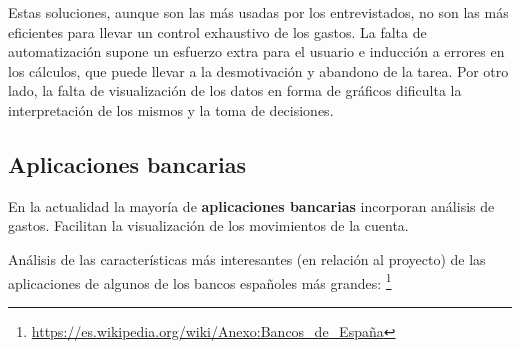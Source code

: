 

Estas soluciones, aunque son las más usadas por los entrevistados, no son las más 
eficientes para llevar un control exhaustivo de los gastos. La falta de automatización 
supone un esfuerzo extra para el usuario e inducción a errores en los cálculos, que puede 
llevar a la desmotivación y abandono de la tarea. Por otro lado, la falta de visualización de 
los datos en forma de gráficos dificulta la interpretación de los mismos y la toma de decisiones.

\subsection{Aplicaciones bancarias}
En la actualidad la mayoría de \textbf{aplicaciones bancarias} incorporan análisis de gastos. 
Facilitan la visualización de los movimientos de la cuenta. 

Análisis de las características más interesantes (en relación al proyecto) 
de las aplicaciones de algunos de los bancos españoles más grandes:
\footnote{\url{https://es.wikipedia.org/wiki/Anexo:Bancos_de_España}}

